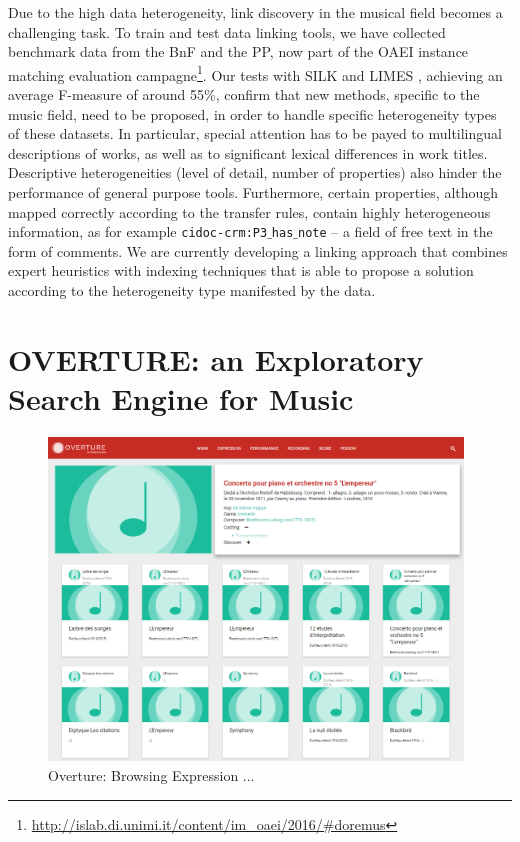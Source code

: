 \documentclass[runningheads,a4paper]{llncs}
\begin{document}
Due to the high data heterogeneity, link discovery in the musical field becomes a challenging task. To train and test data linking tools, we have collected benchmark data from the BnF and the PP, now part of the OAEI instance matching evaluation campagne\footnote{\url{http://islab.di.unimi.it/content/im_oaei/2016/#doremus}}. Our tests with  SILK \cite{jentzsch2010silk} and LIMES \cite{ngomo2011limes}, achieving an average F-measure of around 55\%, confirm that new methods, specific to the music field, need to be proposed, in order to handle specific heterogeneity types of these datasets. In particular, special attention has to be payed to multilingual descriptions of works, as well as to significant lexical differences in work titles. Descriptive heterogeneities (level of detail, number of properties) also hinder the performance of general purpose tools. Furthermore, certain properties, although mapped correctly according to the transfer rules, contain highly heterogeneous information, as for example \texttt{cidoc-crm:P3$\_$has$\_$note} -- a field of free text in the form of comments. We are currently developing a linking approach that combines expert heuristics with indexing techniques that is able to propose a solution according to the heterogeneity type manifested by the data.

\section{OVERTURE: an Exploratory Search Engine for Music}
\label{sec:overture}
\begin{figure}
  \centering
  \includegraphics[width=11cm]{img/overture-detail.png}
  \caption{Overture: Browsing Expression ...}
  \label{fig:overture-detail}
\end{figure}
\end{document}
